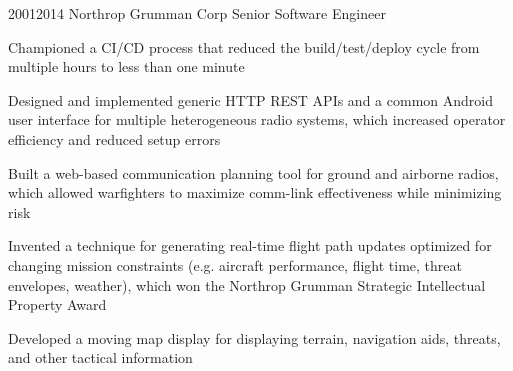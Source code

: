 \job
  {2001}{2014}
  {Northrop Grumman Corp}
  {Senior Software Engineer}
  {\begin{achievements}
    \item Championed a CI/CD process that reduced the build/test/deploy cycle from multiple hours to less than one minute
    \item Designed and implemented generic HTTP REST APIs and a common Android user interface for multiple heterogeneous radio systems, which increased operator efficiency and reduced setup errors
    \item Built a web-based communication planning tool for ground and airborne radios, which allowed warfighters to maximize comm-link effectiveness while minimizing risk
    \item Invented a technique for generating real-time flight path updates optimized for changing mission constraints (e.g. aircraft performance, flight time, threat envelopes, weather), which won the Northrop Grumman Strategic Intellectual Property Award
    \item Developed a moving map display for displaying terrain, navigation aids, threats, and other tactical information
  \end{achievements}}

